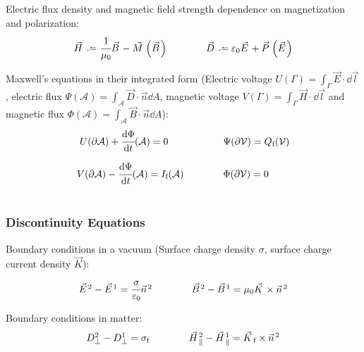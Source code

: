 		\noindent
		Electric flux density and magnetic field strength dependence on magnetization and polarization:
		\begin{equation} \label{Eq:FluxDensityFieldStrength}
			\begin{array}{cc}
				\vec{H} \defeq \cfrac{1}{\mu_0}\Vec{B} - \vec{M}\left(\vec{B}\right)
				& \hsp \vec{D} \defeq \varepsilon_0\vec{E} + \vec{P}\left(\vec{E}\right)
			\end{array}
		\end{equation}


		\noindent
		Maxwell's equations in their integrated form (Electric voltage $U(\Gamma)=\int_\Gamma \vec{E}\cdot\dd\vec{l}$, electric flux $\Psi(\mathcal{A})=\int_\mathcal{A}\vec{D}\cdot\vec{n}\dd{A}$, magnetic voltage $V(\Gamma)=\int_\Gamma \vec{H}\cdot\dd\vec{l}$ and magnetic flux $\Phi(\mathcal{A})=\int_\mathcal{A}\vec{B}\cdot\vec{n}\dd{A}$):
		\begin{equation}
			\begin{array}{rl}
				U(\partial \mathcal{A}) + \cfrac{\dd\Phi}{\dd t}(\mathcal{A}) = 0\phantom{(\mathcal{A})}
				& \hsp \Psi(\partial\mathcal{V}) = Q_\text{f}(\mathcal{V}) \\ \xrowht{40pt}
				V(\partial \mathcal{A}) - \cfrac{\dd \Psi}{\dd t}(\mathcal{A}) = I_\text{f}(\mathcal{A})
				& \hsp \Phi(\partial\mathcal{V}) = 0
			\end{array}
		\end{equation}

		\subsubsection{Discontinuity Equations}
			\noindent
			Boundary conditions in a vacuum (Surface charge density $\sigma$, surface charge current density $\vec{K}$):
			\begin{equation}
				\begin{array}{cc}
					\vec{E}^2 - \vec{E}^1 = \cfrac{\sigma}{\varepsilon_0}\Vec{n}^2
					& \hsp \vec{B}^2 - \vec{B}^1 = \mu_0\vec{K}\times\Vec{n}^2
				\end{array}
			\end{equation}

			\noindent
			Boundary conditions in matter:
			\begin{equation}
				\begin{array}{cc}
					D_\perp^2 - D_\perp^1 = \sigma_\text{f}
					& \hsp \vec{H}_\parallel^2 - \vec{H}_\parallel^1 = \vec{K}_\text{f}\times\Vec{n}^2
				\end{array}
			\end{equation}

